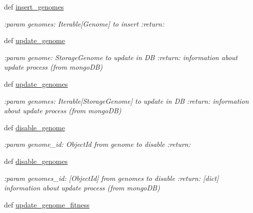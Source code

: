 \begin{DoxyCompactItemize}
def \hyperlink{classNEAT__PyGenetics_1_1NEAT_1_1Repository_1_1GenomeRepository_1_1GenomeRepository_ae5b9ba3a9e6586e42cefdd9daf1379b3}{insert\+\_\+genomes}
\begin{DoxyCompactList}\small\item\em \+:param genomes\+: Iterable\mbox{[}Genome\mbox{]} to insert \+:return\+: \end{DoxyCompactList}\item 
def \hyperlink{classNEAT__PyGenetics_1_1NEAT_1_1Repository_1_1GenomeRepository_1_1GenomeRepository_a62c182ec66b0b0f2e444f6bd62f212a2}{update\+\_\+genome}
\begin{DoxyCompactList}\small\item\em \+:param genome\+: Storage\+Genome to update in DB \+:return\+: information about update process (from mongo\+DB) \end{DoxyCompactList}\item 
def \hyperlink{classNEAT__PyGenetics_1_1NEAT_1_1Repository_1_1GenomeRepository_1_1GenomeRepository_af596e230a4ae914fda99e8f8dfdab8a3}{update\+\_\+genomes}
\begin{DoxyCompactList}\small\item\em \+:param genomes\+: Iterable\mbox{[}Storage\+Genome\mbox{]} to update in DB \+:return\+: information about update process (from mongo\+DB) \end{DoxyCompactList}\item 
def \hyperlink{classNEAT__PyGenetics_1_1NEAT_1_1Repository_1_1GenomeRepository_1_1GenomeRepository_a9a4f5e6dc63ce8a858a79bdb331cc62c}{disable\+\_\+genome}
\begin{DoxyCompactList}\small\item\em \+:param genome\+\_\+id\+: Object\+Id from genome to disable \+:return\+: \end{DoxyCompactList}\item 
def \hyperlink{classNEAT__PyGenetics_1_1NEAT_1_1Repository_1_1GenomeRepository_1_1GenomeRepository_aad8da608f4c1919e72453f1671761b8e}{disable\+\_\+genomes}
\begin{DoxyCompactList}\small\item\em \+:param genomes\+\_\+id\+: \mbox{[}Object\+Id\mbox{]} from genomes to disable \+:return\+: \mbox{[}dict\mbox{]} information about update process (from mongo\+DB) \end{DoxyCompactList}\item 
def \hyperlink{classNEAT__PyGenetics_1_1NEAT_1_1Repository_1_1GenomeRepository_1_1GenomeRepository_a89e1f1e4680f135c1eba0f8d13314896}{update\+\_\+genome\+\_\+fitness}

\end{DoxyCompactItemize}

